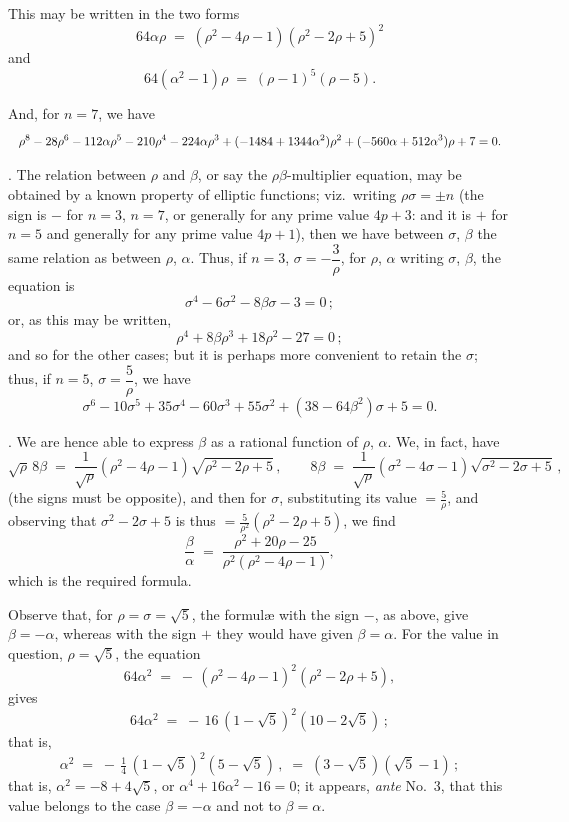 \documentclass[11pt]{article}
\begin{document}
\noindent This may be written in the two forms
\[
64\alpha\rho \;=\; (\rho^2 - 4\rho - 1)(\rho^2 - 2\rho + 5)^2
\]
and
\[
64(\alpha^2 - 1)\rho \;=\; (\rho - 1)^5(\rho - 5).
\]

\noindent And, for $n=7$, we have
\[
\resizebox{\textwidth}{!}{$\displaystyle
\rho^8 - 28\rho^6 - 112\alpha\rho^5 - 210\rho^4 - 224\alpha\rho^3 + (-1484 + 1344\alpha^2)\rho^2 + (-560\alpha + 512\alpha^3)\rho + 7 = 0.
$}
\]

\medskip

. The relation between $\rho$ and $\beta$, or say the $\rho\beta$-multiplier equation, may be obtained by a known property of elliptic functions; viz.\ writing $\rho\sigma = \pm n$ (the sign is $-$ for $n=3$, $n=7$, or generally for any prime value $4p+3$: and it is $+$ for $n=5$ and generally for any prime value $4p+1$), then we have between $\sigma$, $\beta$ the same relation as between $\rho$, $\alpha$. Thus, if $n=3$, $\sigma = -\dfrac{3}{\rho}$, for $\rho$, $\alpha$ writing $\sigma$, $\beta$, the equation is
\[
\sigma^4 - 6\sigma^2 - 8\beta\sigma - 3 = 0\,;
\]
or, as this may be written,
\[
\rho^4 + 8\beta\rho^3 + 18\rho^2 - 27 = 0\,;
\]
and so for the other cases; but it is perhaps more convenient to retain the $\sigma$; thus, if $n=5$, $\sigma = \dfrac{5}{\rho}$, we have
\[
\sigma^6 - 10\sigma^5 + 35\sigma^4 - 60\sigma^3 + 55\sigma^2 + (38 - 64\beta^2)\sigma + 5 = 0.
\]

\newpage

. We are hence able to express $\beta$ as a rational function of $\rho$, $\alpha$. We, in fact, have
\[
\sqrt{\rho}\,8\beta \;=\; \frac{1}{\sqrt{\rho}}(\rho^2 - 4\rho - 1)\sqrt{\rho^2 - 2\rho + 5}\,,\qquad 8\beta \;=\; \frac{1}{\sqrt{\rho}}(\sigma^2 - 4\sigma - 1)\sqrt{\sigma^2 - 2\sigma + 5}\,,
\]
(the signs must be opposite), and then for $\sigma$, substituting its value $=\frac{5}{\rho}$, and observing that $\sigma^2 - 2\sigma + 5$ is thus $=\frac{5}{\rho^2}(\rho^2 - 2\rho + 5)$, we find
\[
\frac{\beta}{\alpha} \;=\; \frac{\rho^2 + 20\rho - 25}{\rho^2(\rho^2 - 4\rho - 1)},
\]
which is the required formula.

\medskip

\noindent Observe that, for $\rho = \sigma = \sqrt{5}$, the formul\ae{} with the sign $-$, as above, give $\beta = -\alpha$, whereas with the sign $+$ they would have given $\beta = \alpha$. For the value in question, $\rho = \sqrt{5}$, the equation
\[
64\alpha^2 \;=\; -\,(\rho^2 - 4\rho - 1)^2(\rho^2 - 2\rho + 5),
\]
gives
\[
64\alpha^2 \;=\; -\,16\,(1 - \sqrt{5})^2(10 - 2\sqrt{5})\,;
\]
that is,
\[
\alpha^2 \;=\; -\,\tfrac{1}{4}\,(1 - \sqrt{5})^2(5 - \sqrt{5})\,,\;=\;(3 - \sqrt{5})(\sqrt{5} - 1)\,;
\]
that is, $\alpha^2 = -8 + 4\sqrt{5}$, or $\alpha^4 + 16\alpha^2 - 16 = 0$; it appears, \textit{ante} No.~3, that this value belongs to the case $\beta = -\alpha$ and not to $\beta = \alpha$.
\end{document}
